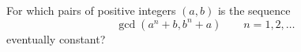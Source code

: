 For which pairs of positive integers $(a,b)$ is the sequence
\[ \gcd(a^n+b, b^n+a) \qquad n = 1, 2, \dotsc \]
eventually constant?